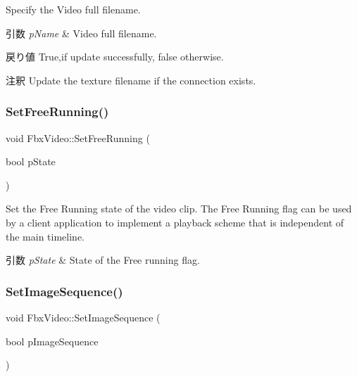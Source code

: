 Specify the Video full filename. 
\begin{DoxyParams}{引数}
{\em p\+Name} & Video full filename. \\
\hline
\end{DoxyParams}
\begin{DoxyReturn}{戻り値}
{\ttfamily True},if update successfully, {\ttfamily false} otherwise. 
\end{DoxyReturn}
\begin{DoxyRemark}{注釈}
Update the texture filename if the connection exists. 
\end{DoxyRemark}
\mbox{\label{class_fbx_video_ade24bcc804d746751c5a35c1bde50333}} 
\subsubsection{\texorpdfstring{Set\+Free\+Running()}{SetFreeRunning()}}
{\footnotesize\ttfamily void Fbx\+Video\+::\+Set\+Free\+Running (\begin{DoxyParamCaption}\item[{bool}]{p\+State }\end{DoxyParamCaption})}

Set the Free Running state of the video clip. The Free Running flag can be used by a client application to implement a playback scheme that is independent of the main timeline. 
\begin{DoxyParams}{引数}
{\em p\+State} & State of the Free running flag. \\
\hline
\end{DoxyParams}
\mbox{\label{class_fbx_video_a511c7cfc220c659c6d07cb4b891572ae}} 
\subsubsection{\texorpdfstring{Set\+Image\+Sequence()}{SetImageSequence()}}
{\footnotesize\ttfamily void Fbx\+Video\+::\+Set\+Image\+Sequence (\begin{DoxyParamCaption}\item[{bool}]{p\+Image\+Sequence }\end{DoxyParamCaption})}

